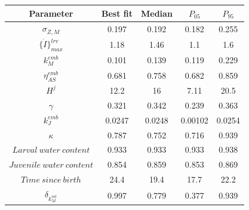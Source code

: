 \begin{tabular}{ccccc}
\toprule
Parameter & Best fit & Median & $P_{05}$ & $P_{95}$\\
\midrule
$\sigma_{Z,M}$ & 0.197 & 0.192 & 0.182 & 0.255\\
$\{ \dot{I} \}_{max}^{lrv}$ & 1.18 & 1.46 & 1.1 & 1.6\\
$k_M^{emb}$ & 0.101 & 0.139 & 0.119 & 0.229\\
$\eta_{AS}^{emb}$ & 0.681 & 0.758 & 0.682 & 0.859\\
$H^{j}$ & 12.2 & 16 & 7.11 & 20.5\\
$\gamma$ & 0.321 & 0.342 & 0.239 & 0.363\\
$k_J^{emb}$ & 0.0247 & 0.0248 & 0.00102 & 0.0254\\
$\kappa$ & 0.787 & 0.752 & 0.716 & 0.939\\
$Larval\ water\ content$ & 0.933 & 0.933 & 0.933 & 0.938\\
$Juvenile\ water\ content$ & 0.854 & 0.859 & 0.853 & 0.869\\
$Time\ since\ birth$ & 24.4 & 19.4 & 17.7 & 22.2\\
$\delta_{k_M^{mt}}$ & 0.997 & 0.779 & 0.377 & 0.939\\
\bottomrule
\end{tabular}
